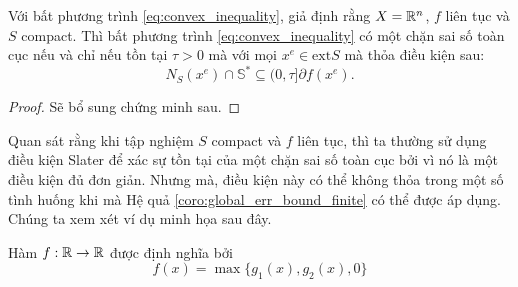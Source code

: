 \begin{coro}
    \label{coro:global_err_bound_finite}
    Với bất phương trình \eqref{eq:convex_inequality}, giả định rằng $X = \mathbb{R}^n$, $f$ liên tục và $S$ compact. Thì bất phương trình \eqref{eq:convex_inequality} có một chặn sai số toàn cục nếu và chỉ nếu tồn tại $\tau > 0$ mà với mọi $x^e \in \text{ext}S$ mà thỏa điều kiện sau:
    \begin{equation}
        N_S(x^e) \cap \mathbb{S}^* \subseteq (0, \tau]\partial f(x^e).
    \end{equation}
\end{coro}
\begin{proof}
    Sẽ bổ sung chứng minh sau.
\end{proof}

Quan sát rằng khi tập nghiệm $S$ compact và $f$ liên tục, thì ta thường sử dụng điều kiện Slater để xác sự tồn tại của một chặn sai số toàn cục bởi vì nó là một điều kiện đủ đơn giản. Nhưng mà, điều kiện này có thể không thỏa trong một số tình huống khi mà Hệ quả \ref{coro:global_err_bound_finite} có thể được áp dụng. Chúng ta xem xét ví dụ minh họa sau đây.

\begin{eg}
    Hàm $f: \mathbb{R} \rightarrow \mathbb{R}$ được định nghĩa bởi
    \begin{equation}
        f(x) = \max\{g_1(x), g_2(x), 0\}
    \end{equation}
\end{eg}